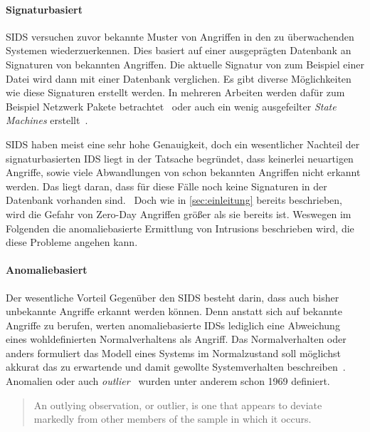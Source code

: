             \paragraph{Signaturbasiert} 
                \ac{SIDS} versuchen zuvor bekannte Muster von Angriffen in den zu überwachenden Systemen wiederzuerkennen.
                Dies basiert auf einer ausgeprägten Datenbank an Signaturen von bekannten Angriffen.
                Die aktuelle Signatur von zum Beispiel einer Datei wird dann mit einer Datenbank verglichen.
                Es gibt diverse Möglichkeiten wie diese Signaturen erstellt werden. 
                In mehreren Arbeiten werden dafür zum Beispiel Netzwerk Pakete betrachtet~\cite{IDSsurvey}
                oder auch ein wenig ausgefeilter \textit{State Machines} erstellt~\cite{SIDSstate}.

                \ac{SIDS} haben meist eine sehr hohe Genauigkeit, doch ein wesentlicher Nachteil der signaturbasierten IDS liegt in der Tatsache begründet,
                dass keinerlei neuartigen Angriffe, sowie viele Abwandlungen von schon bekannten Angriffen nicht erkannt werden.
                Das liegt daran, dass für diese Fälle noch keine Signaturen in der Datenbank vorhanden sind.~\cite{IDSPIETRO2008}
                Doch wie in \autoref{sec:einleitung} bereits beschrieben, wird die Gefahr von Zero-Day Angriffen größer als sie bereits ist.
                Weswegen im Folgenden die anomaliebasierte Ermittlung von Intrusions beschrieben wird, die diese Probleme angehen kann.

            \paragraph{Anomaliebasiert}
                Der wesentliche Vorteil Gegenüber den \ac{SIDS} besteht darin, dass auch bisher unbekannte Angriffe erkannt werden können.
                Denn anstatt sich auf bekannte Angriffe zu berufen, werten anomaliebasierte \acp{IDS} lediglich eine Abweichung eines wohldefinierten Normalverhaltens als Angriff.
                Das Normalverhalten oder anders formuliert das Modell eines Systems im Normalzustand soll möglichst akkurat das zu erwartende und damit gewollte Systemverhalten beschreiben~\cite{ANOMALYBOOKKISHAN2017}.
                Anomalien oder auch \textit{\glqq outlier\grqq\ } wurden unter anderem schon 1969 definiert.

                \blockquote{An outlying observation, or outlier, is one that appears to deviate markedly from other members of the sample in which it occurs.}~\cite{ANOMALYDEFINITION1969}

